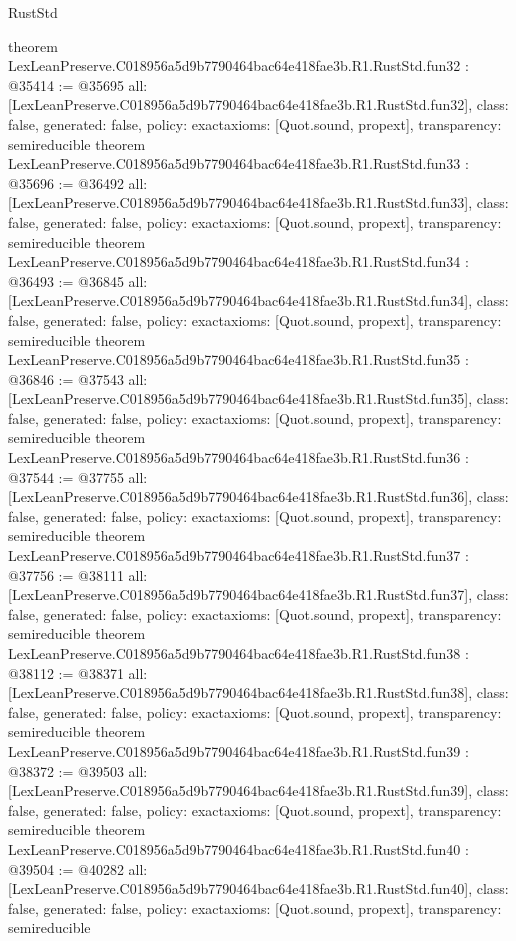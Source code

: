 \begin{lexlean}{RustStd}
\begin{coremodule}
{}
theorem LexLeanPreserve.C018956a5d9b7790464bac64e418fae3b.R1.RustStd.fun32 : @35414 := @35695 {
  all: [LexLeanPreserve.C018956a5d9b7790464bac64e418fae3b.R1.RustStd.fun32],
  class: false,
  generated: false,
  policy: exact{axioms: [Quot.sound, propext]},
  transparency: semireducible
}
theorem LexLeanPreserve.C018956a5d9b7790464bac64e418fae3b.R1.RustStd.fun33 : @35696 := @36492 {
  all: [LexLeanPreserve.C018956a5d9b7790464bac64e418fae3b.R1.RustStd.fun33],
  class: false,
  generated: false,
  policy: exact{axioms: [Quot.sound, propext]},
  transparency: semireducible
}
theorem LexLeanPreserve.C018956a5d9b7790464bac64e418fae3b.R1.RustStd.fun34 : @36493 := @36845 {
  all: [LexLeanPreserve.C018956a5d9b7790464bac64e418fae3b.R1.RustStd.fun34],
  class: false,
  generated: false,
  policy: exact{axioms: [Quot.sound, propext]},
  transparency: semireducible
}
theorem LexLeanPreserve.C018956a5d9b7790464bac64e418fae3b.R1.RustStd.fun35 : @36846 := @37543 {
  all: [LexLeanPreserve.C018956a5d9b7790464bac64e418fae3b.R1.RustStd.fun35],
  class: false,
  generated: false,
  policy: exact{axioms: [Quot.sound, propext]},
  transparency: semireducible
}
theorem LexLeanPreserve.C018956a5d9b7790464bac64e418fae3b.R1.RustStd.fun36 : @37544 := @37755 {
  all: [LexLeanPreserve.C018956a5d9b7790464bac64e418fae3b.R1.RustStd.fun36],
  class: false,
  generated: false,
  policy: exact{axioms: [Quot.sound, propext]},
  transparency: semireducible
}
theorem LexLeanPreserve.C018956a5d9b7790464bac64e418fae3b.R1.RustStd.fun37 : @37756 := @38111 {
  all: [LexLeanPreserve.C018956a5d9b7790464bac64e418fae3b.R1.RustStd.fun37],
  class: false,
  generated: false,
  policy: exact{axioms: [Quot.sound, propext]},
  transparency: semireducible
}
theorem LexLeanPreserve.C018956a5d9b7790464bac64e418fae3b.R1.RustStd.fun38 : @38112 := @38371 {
  all: [LexLeanPreserve.C018956a5d9b7790464bac64e418fae3b.R1.RustStd.fun38],
  class: false,
  generated: false,
  policy: exact{axioms: [Quot.sound, propext]},
  transparency: semireducible
}
theorem LexLeanPreserve.C018956a5d9b7790464bac64e418fae3b.R1.RustStd.fun39 : @38372 := @39503 {
  all: [LexLeanPreserve.C018956a5d9b7790464bac64e418fae3b.R1.RustStd.fun39],
  class: false,
  generated: false,
  policy: exact{axioms: [Quot.sound, propext]},
  transparency: semireducible
}
theorem LexLeanPreserve.C018956a5d9b7790464bac64e418fae3b.R1.RustStd.fun40 : @39504 := @40282 {
  all: [LexLeanPreserve.C018956a5d9b7790464bac64e418fae3b.R1.RustStd.fun40],
  class: false,
  generated: false,
  policy: exact{axioms: [Quot.sound, propext]},
  transparency: semireducible
}
\end{coremodule}
\end{lexlean}
